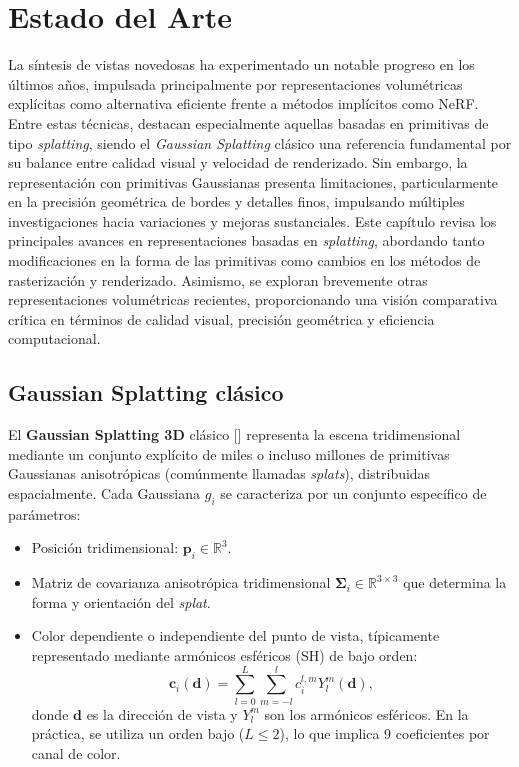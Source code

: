 \chapter{Estado del Arte}\label{chapter:state-of-the-art}

La síntesis de vistas novedosas ha experimentado un notable progreso en los últimos años, impulsada principalmente por representaciones volumétricas explícitas como alternativa eficiente frente a métodos implícitos como NeRF. Entre estas técnicas, destacan especialmente aquellas basadas en primitivas de tipo \textit{splatting}, siendo el \textit{Gaussian Splatting} clásico una referencia fundamental por su balance entre calidad visual y velocidad de renderizado. Sin embargo, la representación con primitivas Gaussianas presenta limitaciones, particularmente en la precisión geométrica de bordes y detalles finos, impulsando múltiples investigaciones hacia variaciones y mejoras sustanciales. Este capítulo revisa los principales avances en representaciones basadas en \textit{splatting}, abordando tanto modificaciones en la forma de las primitivas como cambios en los métodos de rasterización y renderizado. Asimismo, se exploran brevemente otras representaciones volumétricas recientes, proporcionando una visión comparativa crítica en términos de calidad visual, precisión geométrica y eficiencia computacional.

\section{Gaussian Splatting clásico}

El \textbf{Gaussian Splatting 3D} clásico [\cite{kerbl20233d}] representa la escena tridimensional mediante un conjunto explícito de miles o incluso millones de primitivas Gaussianas anisotrópicas (comúnmente llamadas \textit{splats}), distribuidas espacialmente. Cada Gaussiana $g_i$ se caracteriza por un conjunto específico de parámetros:

\begin{itemize}
    \item Posición tridimensional: $\mathbf{p}_i \in \mathbb{R}^3$.
    \item Matriz de covarianza anisotrópica tridimensional $\mathbf{\Sigma}_i \in \mathbb{R}^{3 \times 3}$ que determina la forma y orientación del \textit{splat}.
    \item Color dependiente o independiente del punto de vista, típicamente representado mediante armónicos esféricos (SH) de bajo orden:
    \[
    \mathbf{c}_i(\mathbf{d}) = \sum_{l=0}^{L} \sum_{m=-l}^{l} c_{i}^{l,m} Y_{l}^{m}(\mathbf{d}),
    \]
    donde $\mathbf{d}$ es la dirección de vista y $Y_{l}^{m}$ son los armónicos esféricos. En la práctica, se utiliza un orden bajo ($L \leq 2$), lo que implica 9 coeficientes por canal de color.
\end{itemize}

